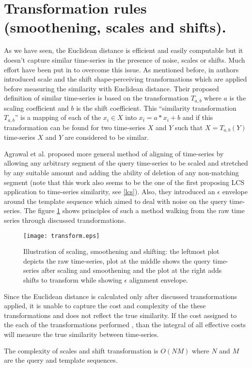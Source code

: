 \section{Transformation rules (smoothening, scales and shifts).} \label{scales_and_shifts}
As we have seen, the Euclidean distance is efficient and easily computable but it doesn't capture similar time-series in the presence of noise, scales or shifts. Much effort have been put in to overcome this issue. As mentioned before, in \cite{citeulike:3815880} authors introduced scale and the shift shape-perceiving transformations which are applied before measuring the similarity with Euclidean distance. Their proposed definition of similar time-series is based on the transformation $T_{a,b}$ where $a$ is the scaling coefficient and $b$ is the shift coefficient. This ``similarity transformation $T_{a,b}$'' is a mapping of each of the $x_{i} \in X$ into $x_{i}\acute{} = a*x_{i}+b$ and if this transformation can be found for two time-series $X$ and $Y$ such that $X=T_{a,b}(Y)$ time-series $X$ and $Y$ are considered to be similar.

Agrawal et al. \cite{citeulike:3816327} proposed more general method of aligning of time-series by allowing any arbitrary segment of the query time-series to be scaled and stretched by any suitable amount and adding the ability of deletion of any non-matching segment (note that this work also seems to be the one of the first proposing LCS application to time-series similarity, see \ref{lcs}). Also, they introduced an $\epsilon$ envelope around the template sequence which aimed to deal with noise on the query time-series. The figure  \ref{fig:transform} shows principles of such a method walking from the raw time series through discussed transformations.

\begin{figure}[tbp]
   \centering
   \texttt{[image: transform.eps]}
   \caption{Illustration of scaling, smoothening and shifting: the leftmost plot depicts the raw time-series, plot at the middle shows the query time-series after scaling and smoothening and the plot at the right adds shifts to transform while showing $\epsilon$ alignment envelope.}
   \label{fig:transform}
\end{figure} 

Since the Euclidean distance is calculated only after discussed transformations applied, it is unable to capture the cost and complexity of the these transformations and does not reflect the true similarity. If the cost assigned to the each of the transformations performed \cite{citeulike:3731711}, than the integral of all effective costs will measure the true similarity between time-series.

The complexity of scales and shift transformation is $O(NM)$ where $N$ and $M$ are the query and template sequences.

